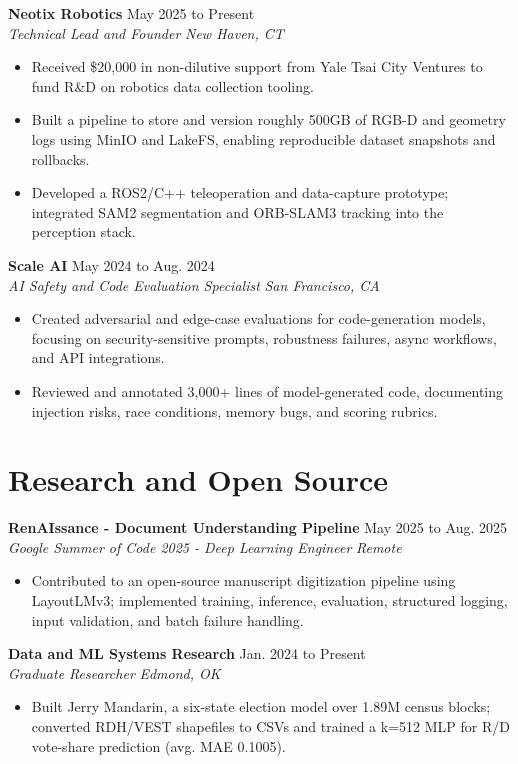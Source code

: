 \documentclass[9pt,letterpaper]{article}
\newcommand{\resumeRole}[4]{
  \textbf{#1} \hfill #2\\
  \textit{#3} \hfill \textit{#4}
}
\begin{document}
\resumeRole{Neotix Robotics}{May 2025 to Present}{Technical Lead and Founder}{New Haven, CT}
\begin{itemize}
  \item Received \$20,000 in non-dilutive support from Yale Tsai City Ventures to fund R\&D on robotics data collection tooling.
  \item Built a pipeline to store and version roughly 500GB of RGB-D and geometry logs using MinIO and LakeFS, enabling reproducible dataset snapshots and rollbacks.
  \item Developed a ROS2/C++ teleoperation and data-capture prototype; integrated SAM2 segmentation and ORB-SLAM3 tracking into the perception stack.
\end{itemize}

\resumeRole{Scale AI}{May 2024 to Aug. 2024}{AI Safety and Code Evaluation Specialist}{San Francisco, CA}
\begin{itemize}
  \item Created adversarial and edge-case evaluations for code-generation models, focusing on security-sensitive prompts, robustness failures, async workflows, and API integrations.
  \item Reviewed and annotated 3,000+ lines of model-generated code, documenting injection risks, race conditions, memory bugs, and scoring rubrics.
\end{itemize}

\section{Research and Open Source}
\resumeRole{RenAIssance - Document Understanding Pipeline}{May 2025 to Aug. 2025}{Google Summer of Code 2025 - Deep Learning Engineer}{Remote}
\begin{itemize}
  \item Contributed to an open-source manuscript digitization pipeline using LayoutLMv3; implemented training, inference, evaluation, structured logging, input validation, and batch failure handling.
\end{itemize}

\resumeRole{Data and ML Systems Research}{Jan. 2024 to Present}{Graduate Researcher}{Edmond, OK}
\begin{itemize}
  \item Built Jerry Mandarin, a six-state election model over 1.89M census blocks; converted RDH/VEST shapefiles to CSVs and trained a k=512 MLP for R/D vote-share prediction (avg. MAE 0.1005).
\end{itemize}
\end{document}
